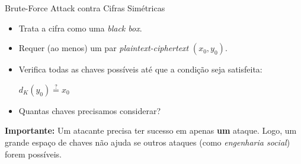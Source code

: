 \documentclass{beamer}
\begin{document}
\begin{frame}{Brute-Force Attack contra Cifras Simétricas}
\vspace{-0.3em}
\begin{itemize}
    \item Trata a cifra como uma \textit{black box}.
    \item Requer (ao menos) um par \textit{plaintext-ciphertext} $(x_0, y_0)$.
    \item Verifica todas as chaves possíveis até que a condição seja satisfeita:
    \begin{center}
        $d_K(y_0) \stackrel{?}{=} x_0$
    \end{center}
    \item Quantas chaves precisamos considerar?
\end{itemize}
\vspace{0.5em}
\small
{}


\vspace{-0.1em}
\smallskip
\textbf{Importante:} Um atacante precisa ter sucesso em apenas \textbf{um} ataque. Logo, um grande espaço de chaves não ajuda se outros ataques (como \textit{engenharia social}) forem possíveis.
\end{frame}





\end{document}
